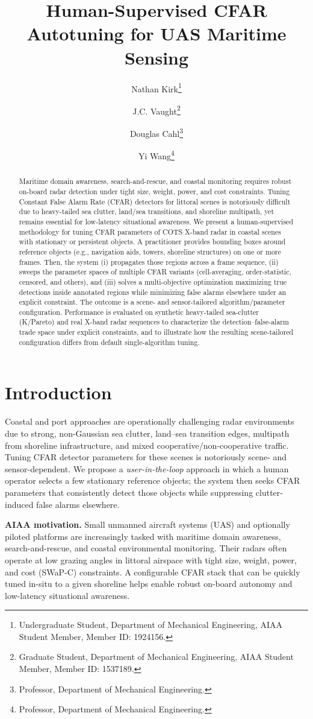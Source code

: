 \documentclass[conf]{new-aiaa}
\title{Human-Supervised CFAR Autotuning for UAS Maritime Sensing}
\author{Nathan Kirk\footnote{Undergraduate Student, Department of Mechanical Engineering, AIAA Student Member, Member ID: 1924156.}}
\author{J.C. Vaught\footnote{Graduate Student, Department of Mechanical Engineering, AIAA Student Member, Member ID: 1537189.}}
\author{Douglas Cahl\footnote{Professor, Department of Mechanical Engineering.}}
\author{Yi Wang\footnote{Professor, Department of Mechanical Engineering.}}
\affil{University of South Carolina, Columbia, SC, 29208}
\date{}
\begin{document}
\maketitle

\begin{abstract}
Maritime domain awareness, search-and-rescue, and coastal monitoring requires robust on-board radar detection under tight size, weight, power, and cost constraints. Tuning Constant False Alarm Rate (CFAR) detectors for littoral scenes is notoriously difficult due to heavy-tailed sea clutter, land/sea transitions, and shoreline multipath, yet remains essential for low-latency situational awareness. We present a human-supervised methodology for tuning CFAR parameters of COTS X-band radar in coastal scenes with stationary or persistent objects. A practitioner provides bounding boxes around reference objects (e.g., navigation aids, towers, shoreline structures) on one or more frames. Then, the system (i) propagates those regions across a frame sequence, (ii) sweeps the parameter spaces of multiple CFAR variants (cell-averaging, order-statistic, censored, and others), and (iii) solves a multi-objective optimization maximizing true detections inside annotated regions while minimizing false alarms elsewhere under an explicit  constraint. The outcome is a scene- and sensor-tailored algorithm/parameter configuration. Performance is evaluated on synthetic heavy-tailed sea-clutter (K/Pareto) and real X-band radar sequences to characterize the detection–false-alarm trade space under explicit  constraints, and to illustrate how the resulting scene-tailored configuration differs from default single-algorithm tuning.
\end{abstract}

\section{Introduction}
Coastal and port approaches are operationally challenging radar environments due to strong, non-Gaussian sea clutter, land--sea transition edges, multipath from shoreline infrastructure, and mixed cooperative/non-cooperative traffic. Tuning CFAR detector parameters for these scenes is notoriously scene- and sensor-dependent. We propose a \emph{user-in-the-loop} approach in which a human operator selects a few stationary reference objects; the system then seeks CFAR parameters that consistently detect those objects while suppressing clutter-induced false alarms elsewhere.

\textbf{AIAA motivation.} Small unmanned aircraft systems (UAS) and optionally piloted platforms are increasingly tasked with maritime domain awareness, search-and-rescue, and coastal environmental monitoring. Their radars often operate at low grazing angles in littoral airspace with tight size, weight, power, and cost (SWaP-C) constraints. A configurable CFAR stack that can be quickly tuned in-situ to a given shoreline helps enable robust on-board autonomy and low-latency situational awareness.
\end{document}
